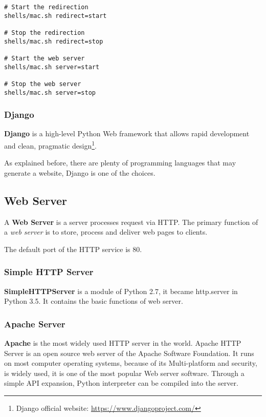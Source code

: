 \begin{lstlisting}[caption={Start/stop redirection/server sample}]
# Start the redirection
shells/mac.sh redirect=start

# Stop the redirection
shells/mac.sh redirect=stop

# Start the web server
shells/mac.sh server=start

# Stop the web server
shells/mac.sh server=stop
\end{lstlisting}

\subsubsection{Django}
\textbf{Django} is a high-level Python Web framework that allows rapid development and clean, pragmatic design\footnote{Django official website: \url{https://www.djangoproject.com/}}.

As explained before, there are plenty of programming languages that may generate a website, Django is one of the choices.

\subsection{Web Server}

A \textbf{Web Server} is a server processes request via HTTP. The primary function of a \textit{web server} is to store, process and deliver web pages to clients.

The default port of the HTTP service is 80. 

\subsubsection{Simple HTTP Server}

\textbf{SimpleHTTPServer} is a module of Python 2.7, it became http.server in Python 3.5. It contains the basic functions of web server.

\subsubsection{Apache Server}
\textbf{Apache} is the most widely used HTTP server in the world. Apache HTTP Server is an open source web server of the Apache Software Foundation. It runs on most computer operating systems, because of its Multi-platform and security, is widely used, it is one of the most popular Web server software. Through a simple API expansion, Python interpreter can be compiled into the server.

